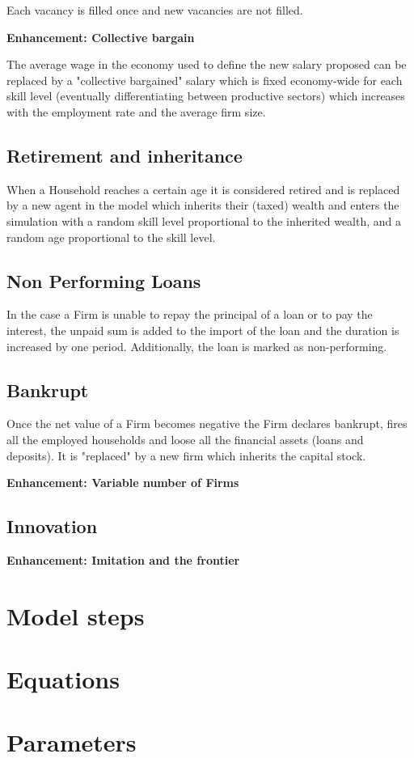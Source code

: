 \documentclass[a4paper, headings=standardclasses]{scrartcl}
\newenvironment{enh}[1][]{\begin{framed}\noindent\textbf{Enhancement: #1}\par}{\end{framed}}
\begin{document}
Each vacancy is filled once and new vacancies are not filled.

\begin{enh}[Collective bargain]
	The average wage in the economy used to define the new salary proposed can be replaced by a "collective bargained" salary which is fixed economy-wide for each skill level (eventually differentiating between productive sectors) which increases with the employment rate and the average firm size.
\end{enh}

\subsection{Retirement and inheritance}
When a Household reaches a certain age it is considered retired and is replaced by a new agent in the model which inherits their (taxed) wealth and enters the simulation with a random skill level proportional to the inherited wealth, and a random age proportional to the skill level.

\subsection{Non Performing Loans}
In the case a Firm is unable to repay the principal of a loan or to pay the interest, the unpaid sum is added to the import of the loan and the duration is increased by one period. Additionally, the loan is marked as non-performing.

\subsection{Bankrupt}
Once the net value of a Firm becomes negative the Firm declares bankrupt, fires all the employed households and loose all the financial assets (loans and deposits). It is "replaced" by a new firm which inherits the capital stock.

\begin{enh}[Variable number of Firms]
\end{enh}


\subsection{Innovation}

\begin{enh}[Imitation and the frontier]\end{enh}

\section{Model steps}
\begin{steps}
	\item
\end{steps}

\section{Equations}

\section{Parameters}

\printbibliography
\end{document}
